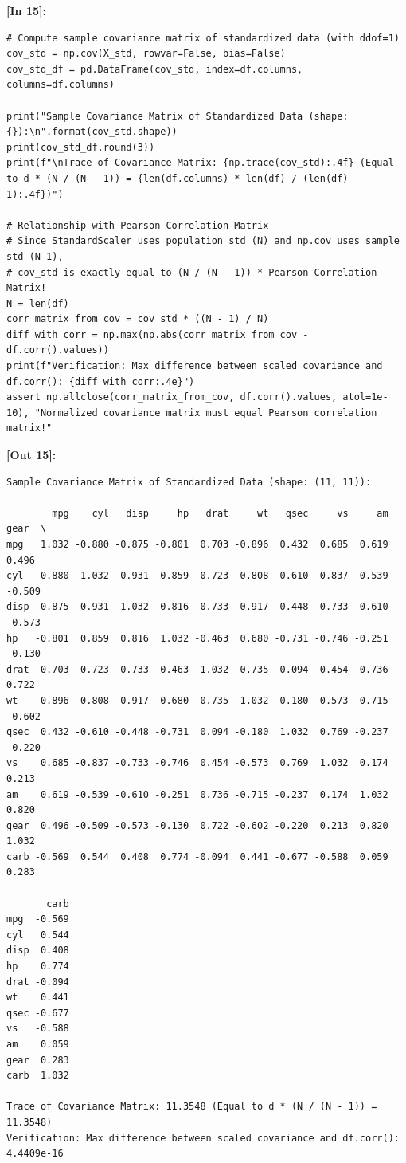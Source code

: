 \vspace{0.6em}
\noindent\textbf{\small [In 15]:}
\begin{lstlisting}[style=pycode]
# Compute sample covariance matrix of standardized data (with ddof=1)
cov_std = np.cov(X_std, rowvar=False, bias=False)
cov_std_df = pd.DataFrame(cov_std, index=df.columns, columns=df.columns)

print("Sample Covariance Matrix of Standardized Data (shape: {}):\n".format(cov_std.shape))
print(cov_std_df.round(3))
print(f"\nTrace of Covariance Matrix: {np.trace(cov_std):.4f} (Equal to d * (N / (N - 1)) = {len(df.columns) * len(df) / (len(df) - 1):.4f})")

# Relationship with Pearson Correlation Matrix
# Since StandardScaler uses population std (N) and np.cov uses sample std (N-1),
# cov_std is exactly equal to (N / (N - 1)) * Pearson Correlation Matrix!
N = len(df)
corr_matrix_from_cov = cov_std * ((N - 1) / N)
diff_with_corr = np.max(np.abs(corr_matrix_from_cov - df.corr().values))
print(f"Verification: Max difference between scaled covariance and df.corr(): {diff_with_corr:.4e}")
assert np.allclose(corr_matrix_from_cov, df.corr().values, atol=1e-10), "Normalized covariance matrix must equal Pearson correlation matrix!"
\end{lstlisting}
\noindent\textbf{\small [Out 15]:}
\begin{lstlisting}[style=output]
Sample Covariance Matrix of Standardized Data (shape: (11, 11)):

        mpg    cyl   disp     hp   drat     wt   qsec     vs     am   gear  \
mpg   1.032 -0.880 -0.875 -0.801  0.703 -0.896  0.432  0.685  0.619  0.496   
cyl  -0.880  1.032  0.931  0.859 -0.723  0.808 -0.610 -0.837 -0.539 -0.509   
disp -0.875  0.931  1.032  0.816 -0.733  0.917 -0.448 -0.733 -0.610 -0.573   
hp   -0.801  0.859  0.816  1.032 -0.463  0.680 -0.731 -0.746 -0.251 -0.130   
drat  0.703 -0.723 -0.733 -0.463  1.032 -0.735  0.094  0.454  0.736  0.722   
wt   -0.896  0.808  0.917  0.680 -0.735  1.032 -0.180 -0.573 -0.715 -0.602   
qsec  0.432 -0.610 -0.448 -0.731  0.094 -0.180  1.032  0.769 -0.237 -0.220   
vs    0.685 -0.837 -0.733 -0.746  0.454 -0.573  0.769  1.032  0.174  0.213   
am    0.619 -0.539 -0.610 -0.251  0.736 -0.715 -0.237  0.174  1.032  0.820   
gear  0.496 -0.509 -0.573 -0.130  0.722 -0.602 -0.220  0.213  0.820  1.032   
carb -0.569  0.544  0.408  0.774 -0.094  0.441 -0.677 -0.588  0.059  0.283   

       carb  
mpg  -0.569  
cyl   0.544  
disp  0.408  
hp    0.774  
drat -0.094  
wt    0.441  
qsec -0.677  
vs   -0.588  
am    0.059  
gear  0.283  
carb  1.032  

Trace of Covariance Matrix: 11.3548 (Equal to d * (N / (N - 1)) = 11.3548)
Verification: Max difference between scaled covariance and df.corr(): 4.4409e-16
\end{lstlisting}

